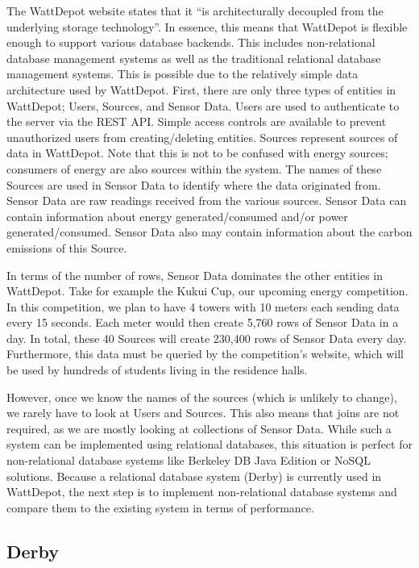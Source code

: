 \documentclass{sig-alternate}
\begin{document}
The WattDepot website states that it ``is architecturally decoupled from the underlying storage technology''.  In essence, this means that WattDepot is flexible enough to support various database backends.  This includes non-relational database management systems as well as the traditional relational database management systems.  This is possible due to the relatively simple data architecture used by WattDepot.  First, there are only three types of entities in WattDepot; Users, Sources, and Sensor Data.  Users are used to authenticate to the server via the REST API.  Simple access controls are available to prevent unauthorized users from creating/deleting entities.  Sources represent sources of data in WattDepot.  Note that this is not to be confused with energy sources; consumers of energy are also sources within the system.  The names of these Sources are used in Sensor Data to identify where the data originated from.  Sensor Data are raw readings received from the various sources.  Sensor Data can contain information about energy generated/consumed and/or power generated/consumed.  Sensor Data also may contain information about the carbon emissions of this Source.

In terms of the number of rows, Sensor Data dominates the other entities in WattDepot.  Take for example the Kukui Cup, our upcoming energy competition. In this competition, we plan to have 4 towers with 10 meters each sending data every 15 seconds.  Each meter would then create 5,760 rows of Sensor Data in a day.  In total, these 40 Sources will create 230,400 rows of Sensor Data every day.  Furthermore, this data must be queried by the competition's website, which will be used by hundreds of students living in the residence halls.

However, once we know the names of the sources (which is unlikely to change), we rarely have to look at Users and Sources.  This also means that joins are not required, as we are mostly looking at collections of Sensor Data.  While such a system can be implemented using relational databases, this situation is perfect for non-relational database systems like Berkeley DB Java Edition or NoSQL solutions.  Because a relational database system (Derby) is currently used in WattDepot, the next step is to implement non-relational database systems and compare them to the existing system in terms of performance.

\subsection{Derby}
\label{sub:derby}
\end{document}
